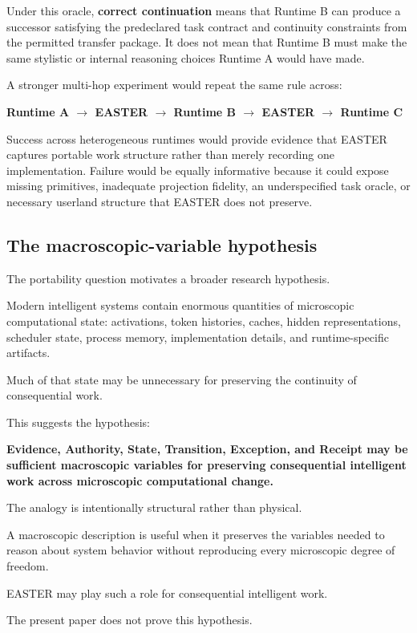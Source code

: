 \documentclass[11pt]{article}
\begin{document}
Under this oracle, \textbf{correct continuation} means that Runtime B can produce a successor satisfying the predeclared task contract and continuity constraints from the permitted transfer package. It does not mean that Runtime B must make the same stylistic or internal reasoning choices Runtime A would have made.

A stronger multi-hop experiment would repeat the same rule across:

\textbf{Runtime A $\rightarrow$ EASTER $\rightarrow$ Runtime B $\rightarrow$ EASTER $\rightarrow$ Runtime C}

Success across heterogeneous runtimes would provide evidence that EASTER captures portable work structure rather than merely recording one implementation. Failure would be equally informative because it could expose missing primitives, inadequate projection fidelity, an underspecified task oracle, or necessary userland structure that EASTER does not preserve.

\subsection{The macroscopic-variable hypothesis}

The portability question motivates a broader research hypothesis.

Modern intelligent systems contain enormous quantities of microscopic computational state: activations, token histories, caches, hidden representations, scheduler state, process memory, implementation details, and runtime-specific artifacts.

Much of that state may be unnecessary for preserving the continuity of consequential work.

This suggests the hypothesis:

\textbf{Evidence, Authority, State, Transition, Exception, and Receipt may be sufficient macroscopic variables for preserving consequential intelligent work across microscopic computational change.}

The analogy is intentionally structural rather than physical.

A macroscopic description is useful when it preserves the variables needed to reason about system behavior without reproducing every microscopic degree of freedom.

EASTER may play such a role for consequential intelligent work.

The present paper does not prove this hypothesis.
\end{document}
